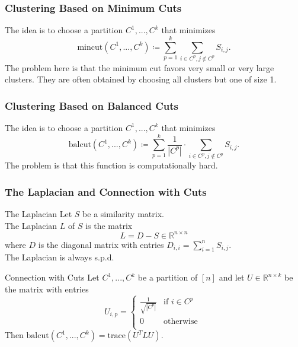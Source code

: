 \documentclass[english]{panikzettel}
\begin{document}
\subsubsection{Clustering Based on Minimum Cuts}
The idea is to choose a partition $C^1,..., C^k$ that minimizes
\[
\text{mincut}(C^1,...,C^k)\coloneqq \sum_{p=1}^k \sum_{i\in C^p, j\notin C^p} S_{i,j}.
\]
The problem here is that the minimum cut favors very small or very large clusters. They are often obtained by choosing all clusters but one of size 1.

\subsubsection{Clustering Based on Balanced Cuts}
The idea is to choose a partition $C^1,..., C^k$ that minimizes
\[
\text{balcut}(C^1,..., C^k)\coloneqq \sum_{p=1}^k \frac{1}{|C^p|}\cdot \sum_{i\in C^p, j\notin C^p} S_{i,j}.
\]
The problem is that this function is computationally hard.

\subsubsection{The Laplacian and Connection with Cuts}

\begin{halfboxl}
\vspace{-\baselineskip}
	\begin{defi}{The Laplacian}
	Let $S$ be a similarity matrix. \\
	The Laplacian $L$ of $S$ is the matrix
	\[
	L=D-S\in \mathbb{R}^{n\times n}
	\]
	where $D$ is the diagonal matrix with entries $D_{i,i}=\sum_{i=1}^n S_{i,j}$.\\
	The Laplacian is always s.p.d.
	\end{defi}
\end{halfboxl}
\begin{halfboxr}
\vspace{-\baselineskip}
	\begin{theo}{Connection with Cuts}
	Let $C^1, ..., C^k$ be a partition of $[n]$ and let $U\in\mathbb{R}^{n\times k}$ be the matrix with entries
	\[
	U_{i,p}=
	\begin{cases}
	\frac{1}{\sqrt{|C^p|}} & \text{if } i\in C^p \\
	0 & \text{otherwise } \\
	\end{cases}
	\]
	Then $\text{balcut}(C^1,...,C^k)=\text{trace}(U^TLU)$.
	\end{theo}
\end{halfboxr}
\end{document}
